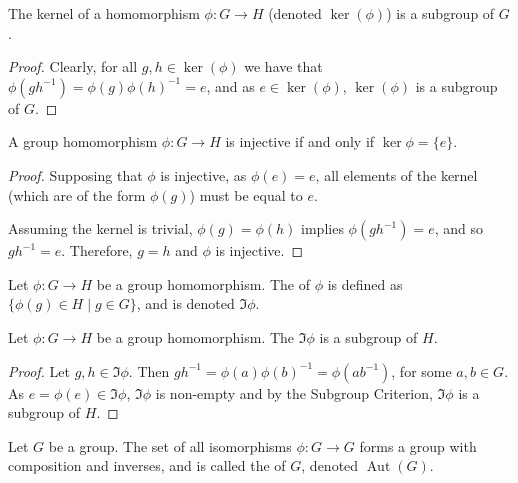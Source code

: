 \documentclass[12pt]{report}
\newcommand{\Aut}{\operatorname{Aut}}
\begin{document}
\begin{lemma}
\label{lem:group-theory:kernels-are-subgroups}
  The kernel of a homomorphism \(\phi : G \to H\) (denoted \(\ker(\phi)\)) is a subgroup of \(G\).
\end{lemma}

\begin{proof}
 Clearly, for all \(g, h \in \ker(\phi)\) we have that \(\phi(gh^{-1}) = \phi(g)\phi(h)^{-1} = e\), and as \(e \in \ker(\phi)\), \(\ker (\phi)\) is a subgroup of \(G\).
\end{proof}


\begin{lemma}
  A group homomorphism \(\phi : G \to H\) is injective if and only if \(\ker{\phi} = \{e\}\).
\end{lemma}

\begin{proof}
  Supposing that \(\phi\) is injective, as \(\phi(e) = e\), all elements of the kernel (which are of the form \(\phi(g)\)) must be equal to \(e\).

  Assuming the kernel is trivial, \(\phi(g) = \phi(h)\) implies \(\phi(gh^{-1}) = e\), and so \(gh^{-1} = e\).
  Therefore, \(g = h\) and \(\phi\) is injective.
\end{proof}

\begin{definition}
  Let \(\phi : G \to H\) be a group homomorphism.
  The  of \(\phi\) is defined as \(\{\phi(g) \in H \mid g \in G\}\), and is denoted \(\Im \phi\).
\end{definition}

\begin{lemma}
  Let \(\phi : G \to H\) be a group homomorphism.
  The \(\Im \phi\) is a subgroup of \(H\).
\end{lemma}

\begin{proof}
  Let \(g, h \in \Im \phi\).
  Then \(gh^{-1} = \phi(a)\phi(b)^{-1} = \phi(ab^{-1})\), for some \(a,b \in G\).
  As \(e = \phi(e) \in \Im \phi\), \(\Im \phi\) is non-empty and by the Subgroup Criterion, \(\Im \phi\) is a subgroup of \(H\).
\end{proof}

\begin{definition}
  \label{def:group-theory:automorphism-group}
  Let \(G\) be a group.
  The set of all isomorphisms \(\phi : G \to G\) forms a group with composition and inverses, and is called the  of \(G\), denoted \(\Aut (G)\).
\end{definition}
\end{document}
